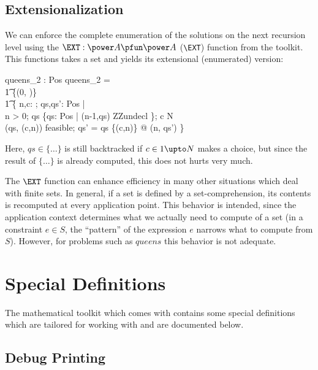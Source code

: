 \documentclass{article}
\begin{document}
\subsection{Extensionalization}

We can enforce the complete enumeration of the solutions on the
next recursion level using the $\EXT: \power A \pfun \power A$
(\verb:\EXT:) function from the toolkit. This functions takes
a set and yields its extensional (enumerated) version:

\begin{axdef}
  queens_2 : \nat \rel \power Pos
\where
  queens_2 = \\\t1
    \{(0, \emptyset)\} \cup \\ \t1
    \{\<
      n,c: \nat; qs,qs': \power Pos | \\
      n > 0;
      qs \in \EXT \{qs: \power Pos | (n-1,qs) \in ZZundecl \};
      c  \upto N \\
      (qs, (c,n)) \in feasible; 
      qs' = qs \cup \{(c,n)\}
       @ 
      (n, qs') \} \>
\end{axdef}

Here, $qs \in \{\ldots\}$ is still backtracked if $c \in 1 \upto N$ makes
a choice, but since the result of $\{\ldots\}$ is already computed, this
does not hurts very much.

The $\EXT$ function can enhance efficiency in many other situations
which deal with finite sets. In general, if a set is defined
by a set-comprehension, its contents is recomputed at every
application point. This behavior is intended, since 
the application context determines what we actually
need to compute of a set (in a constraint $e \in S$, the
``pattern'' of the expression $e$ narrows what 
to compute from $S$). However, for problems such as $queens$
this behavior is not adequate.


\section{Special Definitions}


The mathematical toolkit which comes with \Zeta{} contains
some special definitions which are tailored for working with \ZAP{}
and are documented below.

\subsection{Debug Printing}
\end{document}
